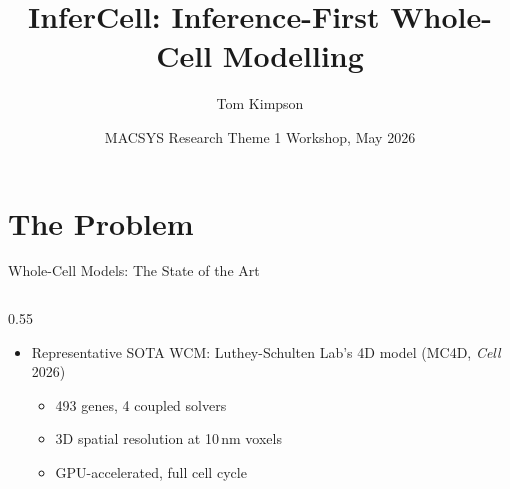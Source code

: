 \documentclass[aspectratio=169]{beamer}
\title[InferCell]{InferCell: Inference-First Whole-Cell Modelling}
\author{Tom Kimpson}
\institute{University of Melbourne}
\date[2026]{MACSYS Research Theme 1 Workshop, May 2026}
\begin{document}
\begin{frame}[plain]
	\titlepage
\end{frame}




\section{The Problem}



\begin{frame}{Whole-Cell Models: The State of the Art}
	\begin{columns}[T]
		\begin{column}{0.55\textwidth}
			\begin{itemize}\itemsep6pt
				\item Representative SOTA WCM: Luthey-Schulten Lab's 4D model (MC4D, \textit{Cell} 2026)
				\begin{itemize}\itemsep3pt
					\item 493 genes, 4 coupled solvers
					\item 3D spatial resolution at 10\,nm voxels
					\item GPU-accelerated, full cell cycle
				\end{itemize}


\end{itemize}
\end{column}
\end{columns}
\end{frame}
\end{document}
